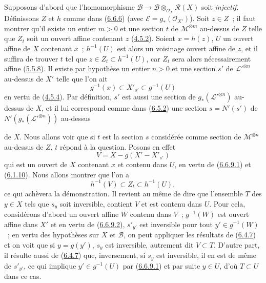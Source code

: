 Supposons d'abord que l'homomorphisme
$\mathcal{B}\to
\mathcal{B}\otimes_{\mathcal{O}_X}\mathcal{R}(X)$ soit \emph{injectif}.
Définissons $Z$ et $h$ comme dans (\hyperref[II.6.6.6-fr]{6.6.6}) (avec
$\mathcal{E}=g_*(\mathcal{O}_{X'})$). Soit $z\in Z$~; il faut montrer qu'il
existe un entier $m>0$ et une section $t$ de $\mathcal{M}^{\otimes m}$
au-dessus de $Z$ telle que $Z_t$ soit un ouvert affine contenant $z$
(\hyperref[II.4.5.2-fr]{4.5.2}). Soient $x=h(z)$, $U$ un ouvert affine de
$X$ contenant $x$~; $h^{-1}(U)$ est alors un voisinage ouvert affine de $z$,
et il suffira de trouver $t$ tel que $z\in Z_t\subset h^{-1}(U)$, car $Z_t$
sera alors nécessairement affine (\hyperref[II.5.5.8-fr]{5.5.8}). Il existe
par hypothèse un entier $n>0$ et une section $s'$ de
${\mathcal{L}'}^{\otimes n}$ au-dessus de $X'$ telle que l'on ait
\[
\label{II.6.6.9.1-fr}
g^{-1}(x)\subset X'_{s'}\subset g^{-1}(U)
\tag{6.6.9.1}
\]
en vertu de (\hyperref[II.4.5.4-fr]{4.5.4}). Par définition, $s'$ est aussi
une section de $g_*({\mathcal{L}'}^{\otimes n})$ au-dessus de $X$, et il lui
correspond comme dans (\hyperref[II.6.5.2-fr]{6.5.2}) une section
$s=N'(s')$ de $N'(g_*({\mathcal{L}'}^{\otimes n}))$ au-dessus


de $X$. Nous allons voir que si $t$ est la section $s$ considérée comme
section de $\mathcal{M}^{\otimes n}$ au-dessus de $Z$, $t$ répond à la
question. Posons en effet
\[
\label{II.6.6.9.2-fr}
V=X-g(X'-X'_{s'})
\tag{6.6.9.2}
\]
qui est un ouvert de $X$ contenant $x$ et contenu dans $U$, en vertu de
(\hyperref[II.6.6.9.1-fr]{6.6.9.1}) et
(\hyperref[II.6.1.10-fr]{6.1.10}). Nous allons montrer que l'on a
\[
\label{II.6.6.9.3-fr}
h^{-1}(V)\subset Z_t\subset h^{-1}(U),
\tag{6.6.9.3}
\]
ce qui achèvera la démonstration. Il revient au même de dire que l'ensemble
$T$ des $y\in X$ tels que $s_y$ soit inversible, contient $V$ et est contenu
dans $U$. Pour cela, considérons d'abord un ouvert affine $W$ contenu dans
$V$~; $g^{-1}(W)$ est ouvert affine dans $X'$ et en vertu de
(\hyperref[II.6.6.9.2-fr]{6.6.9.2}), $s'_{y'}$ est inversible pour tout
$y'\in g^{-1}(W)$~; en vertu des hypothèses sur $X$ et $\mathcal{B}$, on
peut appliquer les résultats de (\hyperref[II.6.4.7-fr]{6.4.7}) et on voit
que si $y=g(y')$, $s_y$ est inversible, autrement dit $V\subset T$. D'autre
part, il résulte aussi de (\hyperref[II.6.4.7-fr]{6.4.7}) que, inversement,
si $s_y$ est inversible, il en est de même de $s'_{y'}$, ce qui implique
$y'\in g^{-1}(U)$ par (\hyperref[II.6.6.9.1-fr]{6.6.9.1}) et par suite
$y\in U$, d'où $T\subset U$ dans ce cas.


